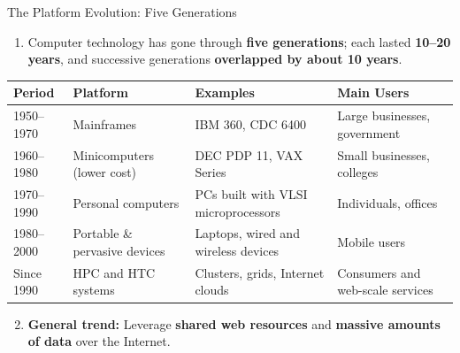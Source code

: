 \begin{frame}{The Platform Evolution: Five Generations}
\begin{enumerate}
\item<1-> Computer technology has gone through \textbf{five generations}; each lasted \textbf{10--20 years}, and successive generations \textbf{overlapped by about 10 years}.
\end{enumerate}
\begin{table}
\centering
\renewcommand{\arraystretch}{1.25}
\scriptsize
\begin{tabular}{|p{2cm}|p{3.6cm}|p{4.2cm}|p{3.4cm}|}
\hline
\textbf{Period} & \textbf{Platform} & \textbf{Examples} & \textbf{Main Users} \\ \hline
1950--1970 & Mainframes & IBM 360, CDC 6400 & Large businesses, government \\ \hline
1960--1980 & Minicomputers (lower cost) & DEC PDP 11, VAX Series & Small businesses, colleges \\ \hline
1970--1990 & Personal computers & PCs built with VLSI microprocessors & Individuals, offices \\ \hline
1980--2000 & Portable \& pervasive devices & Laptops, wired and wireless devices & Mobile users \\ \hline
Since 1990 & HPC and HTC systems & Clusters, grids, Internet clouds & Consumers and web-scale services \\ \hline
\end{tabular}
\end{table}
\begin{enumerate}\setcounter{enumi}{1}
\item<2-> \textbf{General trend:} Leverage \textbf{shared web resources} and \textbf{massive amounts of data} over the Internet.
\end{enumerate}
\end{frame}

